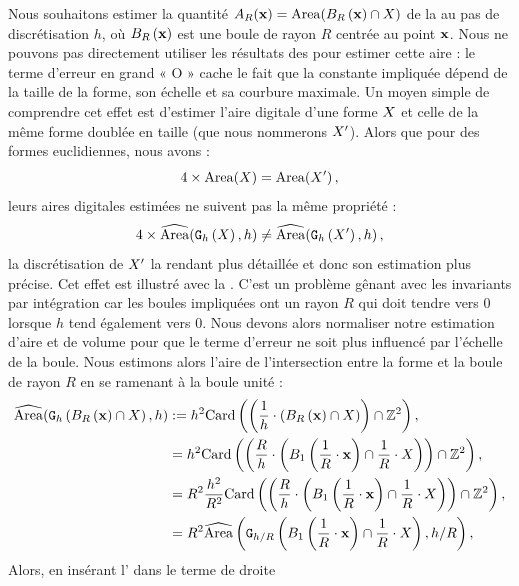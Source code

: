 Nous souhaitons estimer la quantité $A_R(\vx) = \Area(\Ball{R}{\vx}\cap\Shape)$ de la
 au pas de discrétisation $h$, où $\Ball{R}{\vx}$ est une
boule de rayon $R$ centrée au point $\vx$. Nous ne pouvons pas directement
utiliser les résultats des
 pour estimer cette
aire : le terme d'erreur en grand « O » cache le fait que la constante impliquée
dépend de la taille de la forme, son échelle et sa courbure maximale. Un moyen
simple de comprendre cet effet est d'estimer l'aire digitale d'une forme $\Shape$ et
celle de la même forme doublée en taille (que nous nommerons
$\Shape'$). Alors que pour des formes euclidiennes, nous avons :
%
\begin{equation}
  4 \times \Area(\Shape) = \Area(\Shape') \,,
\end{equation}
%
leurs aires digitales estimées ne suivent pas la même propriété :
%
\begin{equation}
  4 \times \AreaC(\DSh,h) \ne \AreaC(\DigF{\Shape'}{h},h) \,,
\end{equation}
%
la discrétisation de $\Shape'$ la rendant plus détaillée et donc son estimation
plus précise. Cet effet est illustré avec la . C'est
un problème gênant avec les invariants par intégration car les boules impliquées
ont un rayon $R$ qui doit tendre vers $0$ lorsque $h$ tend également vers $0$.
Nous devons alors normaliser notre estimation d'aire et de volume pour que le
terme d'erreur ne soit plus influencé par l'échelle de la boule. Nous estimons
alors l'aire de l'intersection entre la forme et la boule de rayon $R$ en se
ramenant à la boule unité :
%
\begin{align}
  \AreaC(\DigF{\Ball{R}{\vx} \cap \Shape}{h}, h) & \EqDef h^2 \MCard\left( \left( \frac{1}{h} \cdot \left( \Ball{R}{\vx} \cap \Shape \right) \right) \cap \Z^2 \right), \\
   & = h^2 \MCard\left( \left(\frac{R}{h} \cdot \left( \Ball{1}{\frac{1}{R} \cdot \vx} \cap \frac{1}{R} \cdot \Shape\right) \right) \cap \Z^2 \right), \\
   & = R^2 \frac{h^2}{R^2} \MCard\left( \left(\frac{R}{h} \cdot \left( \Ball{1}{\frac{1}{R} \cdot \vx} \cap \frac{1}{R} \cdot \Shape\right) \right) \cap \Z^2 \right), \\
   & = R^2 \AreaC\left( \DigF{\Ball{1}{\frac{1}{R} \cdot \vx} \cap \frac{1}{R} \cdot \Shape}{h/R}, h/R \right), \label{eq:Area_unitary_ball}
\end{align}
%
Alors, en insérant l' dans le terme de droite
